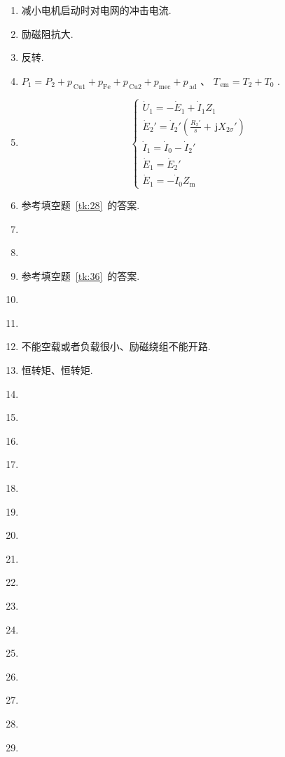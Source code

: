 \documentclass[lang=cn,11pt,marginpar=margintrue]{elegantbook}%
\newcommand{\zt}[1]{\,\mathrm{#1}}
\begin{document}
\begin{enumerate}
	\item \label{tk:27}减小电机启动时对电网的冲击电流.
	\item \label{tk:28}励磁阻抗大.
	\item \label{tk:29}反转.
	\item \label{tk:30} $P_1=P_2+p_{\zt{Cu}1}+p_{\mathrm{Fe}}+p_{\zt{Cu}2}+p_{\mathrm{mec}}+p_{\zt{ad}}$ 、 $T_{\zt{em}}=T_2+T_0$ .
	\item \label{tk:31}\begin{equation*}
		\begin{cases}
			\dot{U}_1=-\dot{E}_1+\dot{I}_1 Z_1\\
			\dot{E}_2'=\dot{I}_2'\left( \frac{R_2'}{s}+\zt{j}X_{2\sigma}' \right)\\
			\dot{I}_1=\dot{I}_0-\dot{I}_2'\\
			\dot{E}_1=\dot{E}_2'\\
			\dot{E}_1=-\dot{I}_0Z_{\mathrm{m}}
		\end{cases}
	\end{equation*}
	\item \label{tk:32}参考填空题~\ref{tk:28}~的答案.
	\item \label{tk:33}
	\item \label{tk:34}
	\item \label{tk:35}参考填空题~\ref{tk:36}~的答案.
	\item \label{tk:36}
	\item \label{tk:37}
	\item \label{tk:38}不能空载或者负载很小、励磁绕组不能开路.
	\item \label{tk:39}恒转矩、恒转矩.
	\item \label{tk:40}
	\item \label{tk:41}
	\item \label{tk:42}
	\item \label{tk:43}
	\item \label{tk:44}
	\item \label{tk:45}
	\item \label{tk:46}
	\item \label{tk:47}
	\item \label{tk:48}
	\item \label{tk:49}
	\item \label{tk:50}
	\item \label{tk:51}
	\item \label{tk:52}
	\item \label{tk:53}
	\item \label{tk:54}
	\item \label{tk:55}

\end{enumerate}
\end{document}
